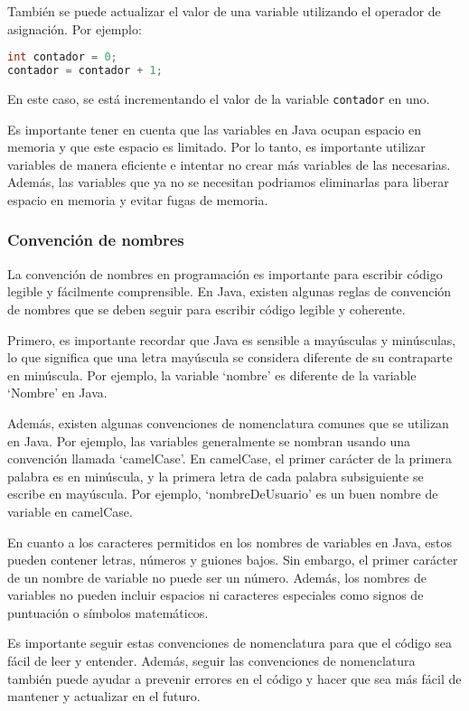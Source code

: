\documentclass{article}
\begin{document}
También se puede actualizar el valor de una variable utilizando el operador de asignación. Por ejemplo:

\begin{lstlisting}[language=Java]
int contador = 0;
contador = contador + 1;
\end{lstlisting}
En este caso, se está incrementando el valor de la variable \lstinline{contador} en uno.

Es importante tener en cuenta que las variables en Java ocupan espacio en memoria y que este espacio es limitado. Por lo tanto, es importante utilizar variables de manera eficiente e intentar no crear más variables de las necesarias. Además, las variables que ya no se necesitan podriamos eliminarlas para liberar espacio en memoria y evitar fugas de memoria.

\subsubsection{Convención de nombres}
La convención de nombres en programación es importante para escribir código legible y fácilmente comprensible. En Java, existen algunas reglas de convención de nombres que se deben seguir para escribir código legible y coherente.

Primero, es importante recordar que Java es sensible a mayúsculas y minúsculas, lo que significa que una letra mayúscula se considera diferente de su contraparte en minúscula. Por ejemplo, la variable \enquote*{nombre} es diferente de la variable \enquote*{Nombre} en Java.

Además, existen algunas convenciones de nomenclatura comunes que se utilizan en Java. Por ejemplo, las variables generalmente se nombran usando una convención llamada \enquote*{camelCase}. En camelCase, el primer carácter de la primera palabra es en minúscula, y la primera letra de cada palabra subsiguiente se escribe en mayúscula. Por ejemplo, \enquote*{nombreDeUsuario} es un buen nombre de variable en camelCase.

En cuanto a los caracteres permitidos en los nombres de variables en Java, estos pueden contener letras, números y guiones bajos. Sin embargo, el primer carácter de un nombre de variable no puede ser un número. Además, los nombres de variables no pueden incluir espacios ni caracteres especiales como signos de puntuación o símbolos matemáticos.

Es importante seguir estas convenciones de nomenclatura para que el código sea fácil de leer y entender. Además, seguir las convenciones de nomenclatura también puede ayudar a prevenir errores en el código y hacer que sea más fácil de mantener y actualizar en el futuro.
\end{document}
